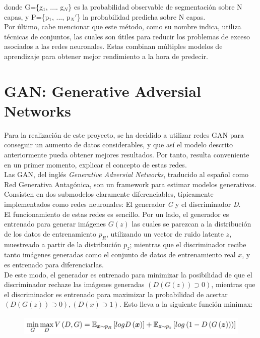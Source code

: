 \documentclass[spanish,a4paper, 11pt]{article}
\numberwithin{equation}{section}
\numberwithin{table}{section}
\numberwithin{figure}{section}
\begin{document}
	
donde G=\{g$_{1}$, .... g$_{N}$\} es la probabilidad observable de segmentación sobre N capas, y P=\{p$_{1}$, ..., p$_{N}'$\} la probabilidad predicha sobre N capas.\\
	
Por último, cabe mencionar que este método, como su nombre indica, utiliza técnicas de conjuntos, las cuales son útiles para reducir los problemas de exceso asociados a las redes neuronales. Estas combinan múltiples modelos de aprendizaje para obtener mejor rendimiento a la hora de predecir.	


\section{GAN: Generative Adversial Networks}
	
	
Para la realización de este proyecto, se ha decidido a utilizar redes GAN para conseguir un aumento de datos considerables, y que así el modelo descrito anteriormente pueda obtener mejores resultados. Por tanto, resulta conveniente en un primer momento, explicar el concepto de estas redes.\\
	
Las GAN, del inglés \textit{Generative Adversial Networks}, traducido al español como Red Generativa Antagónica, son un framework para estimar modelos generativos. Consisten en dos submodelos claramente diferenciables, típicamente implementados como redes neuronales: El generador \textit{G} y el discriminador \textit{D}.\\
	
El funcionamiento de estas redes es sencillo. Por un lado, el generador es entrenado para generar imágenes $G(z)$ las cuales se parezcan a la distribución de los datos de entrenamiento $p_{R}$, utilizando un vector de ruido latente $z$, muestreado a partir de la distribución $p_{z}$; mientras que el discriminador recibe tanto imágenes generadas como el conjunto de datos de entrenamiento real $x$, y es entrenado para diferenciarlas.\\
	
De este modo, el generador es entrenado para minimizar la posibilidad de que el discriminador rechaze las imágenes generadas $(D(G(z)) \supset 0)$, mientras que el discriminador es entrenado para maximizar la probabilidad de acertar $(D(G(z)) \supset 0), (D(x) \supset 1)$. Esto lleva a la siguiente función minimax:
	
\begin{figure}[H]
	 \centering
	\includegraphics[height=1cm]{minimax.png}
	\label{fig:minimax}
\end{figure}
	
\end{document}
